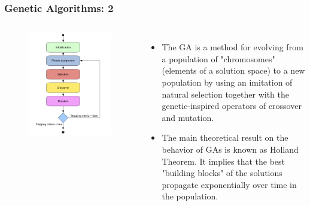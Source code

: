 \documentclass{beamer}
\begin{document}
\begin{frame}
\frametitle{Genetic Algorithms: 2}
\begin{columns}[c]
\begin{figure}[h]
\includegraphics[width = \textwidth]{"pictures/genetic_algo.png"}
\end{figure}
\begin{itemize}
\item The GA is a method for evolving from a population of "chromosomes" (elements of a solution space) to a new population
by using an imitation of natural selection together with the genetic-inspired operators of crossover and mutation.
\item The main theoretical result on the behavior of GAs is known as Holland Theorem. It implies that the best "building blocks" of the solutions propagate exponentially over time in the population.
\end{itemize}


\end{columns}
\end{frame}
\end{document}
